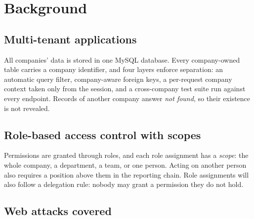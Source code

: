 \section{Background}

\subsection{Multi-tenant applications}
All companies' data is stored in one MySQL database. Every company-owned table carries a company identifier, and four layers enforce separation: an automatic query filter, company-aware foreign keys, a per-request company context taken only from the session, and a cross-company test suite run against every endpoint. Records of another company answer \emph{not found}, so their existence is not revealed.

\subsection{Role-based access control with scopes}
Permissions are granted through roles, and each role assignment has a \emph{scope}: the whole company, a department, a team, or one person. Acting on another person also requires a position above them in the reporting chain. Role assignments will also follow a delegation rule: nobody may grant a permission they do not hold. 

\subsection{Web attacks covered}
